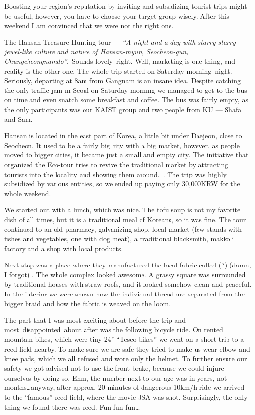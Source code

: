 \begin{post}
	\begin{content}
Boosting your region's reputation by inviting and subsidizing tourist trips might be useful, however, you have to choose your target group wisely. After this weekend I am convinced that we were not the right one.

The Hansan Treasure Hunting tour --- \textit{``A night and a day with starry-starry jewel-like culture and nature of Hansan-myun, Seocheon-gun, Chungcheongnamdo''.} Sounds lovely, right. Well, marketing is one thing, and reality is the other one. The whole trip started on Saturday \sout{morning} night. Seriously, departing at 8am from Gangnam is an insane idea. Despite catching the only traffic jam in Seoul on Saturday morning we managed to get to the bus on time and even snatch some breakfast and coffee. The bus was fairly empty, as the only participants was our KAIST group and two people from KU --- Shafa and Sam.

Hansan is located in the east part of Korea, a little bit under Daejeon, close to Seocheon. It used to be a fairly big city with a big market, however, as people moved to bigger cities, it became just a small and empty city. The initiative that organized the Eco-tour tries to revive the traditional market by attracting tourists into the locality and showing them around. . The trip was highly subsidized by various entities, so we ended up paying only 30,000KRW for the whole weekend.

We started out with a lunch, which was nice. The tofu soup is not my favorite dish of all times, but it is a traditional meal of Koreans, so it was fine. The tour continued to an old pharmacy, galvanizing shop, local market (few stands with fishes and vegetables, one with dog meat), a traditional blacksmith, makkoli factory and a shop with local products.

Next stop was a place where they manufactured the local fabric called (?) (damn, I forgot) . The whole complex looked awesome. A grassy square was surrounded by traditional houses with straw roofs, and it looked somehow clean and peaceful. In the interior we were shown how the individual thread are separated from the bigger braid and how the fabric is weaved on the loom.

The part that I was most exciting about before the trip and most disappointed about after was the following bicycle ride. On rented mountain bikes, which were tiny 24'' ``Tesco-bikes'' we went on a short trip to a reed field nearby. To make sure we are safe they tried to make us wear elbow and knee pads, which we all refused and wore only the helmet. To further ensure our safety we got advised not to use the front brake, because we could injure ourselves by doing so. Ehm, the number next to our age was in years, not months{\ldots}anyway, after approx. 20 minutes of dangerous 10km/h ride we arrived to the ``famous'' reed field, where the movie JSA was shot. Surprisingly, the only thing we found there was reed. Fun fun fun\ldots


\end{content}
\end{post}
